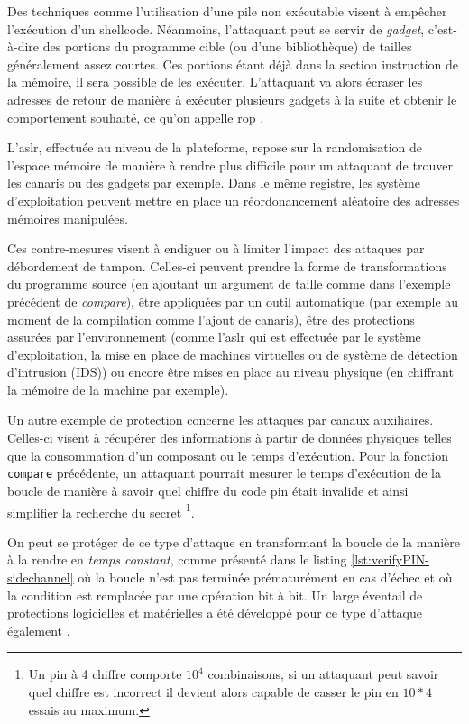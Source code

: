         Des techniques comme l'utilisation d'une pile non exécutable visent à empêcher l'exécution d'un shellcode. Néanmoins, l'attaquant peut se servir de \textit{gadget}, c'est-à-dire des portions du programme cible (ou d'une bibliothèque) de tailles généralement assez courtes. Ces portions étant déjà dans la section instruction de la mémoire, il sera possible de les exécuter.
        L'attaquant va alors écraser les adresses de retour de manière à exécuter plusieurs gadgets à la suite et obtenir le comportement souhaité, ce qu'on appelle \gls{rop} \cite{Roemer/TISSEC12}.
        
        L'\gls{aslr}, effectuée au niveau de la plateforme, repose sur la randomisation de l'espace mémoire de manière à rendre plus difficile pour un attaquant de trouver les canaris ou des gadgets par exemple. Dans le même registre, les système d'exploitation peuvent mettre en place un réordonancement aléatoire des adresses mémoires manipulées.
        
        Ces contre-mesures visent à endiguer ou à limiter l'impact des attaques par débordement de tampon. Celles-ci peuvent prendre la forme de transformations du programme source (en ajoutant un argument de taille comme dans l'exemple précédent de \textit{compare}), être appliquées par un outil automatique (par exemple au moment de la compilation comme l'ajout de canaris), être des protections assurées par l'environnement (comme l'\gls{aslr} qui est effectuée par le système d'exploitation, la mise en place de machines virtuelles ou de système de détection d'intrusion (IDS)) ou encore être mises en place au niveau physique (en chiffrant la mémoire de la machine par exemple).
        
        Un autre exemple de protection concerne les attaques par canaux auxiliaires. Celles-ci visent à récupérer des informations à partir de données physiques telles que la consommation d'un composant ou le temps d'exécution. Pour la fonction \texttt{compare} précédente, un attaquant pourrait mesurer le temps d'exécution de la boucle de manière à savoir quel chiffre du code \gls{pin} était invalide et ainsi simplifier la recherche du secret \footnote{Un \gls{pin} à 4 chiffre comporte $10^4$ combinaisons, si un attaquant peut savoir quel chiffre est incorrect il devient alors capable de casser le \gls{pin} en $10 * 4$ essais au maximum.}.
        
        On peut se protéger de ce type d'attaque en transformant la boucle de la manière à la rendre en \textit{temps constant}, comme présenté dans le listing \ref{lst:verifyPIN-sidechannel} où la boucle n'est pas terminée prématurément en cas d'échec et où la condition est remplacée par une opération bit à bit. Un large éventail de protections logicielles et matérielles a été développé pour ce type d'attaque également \cite{Wittman/RSA08, Veryrat/TACIS12}.
        
